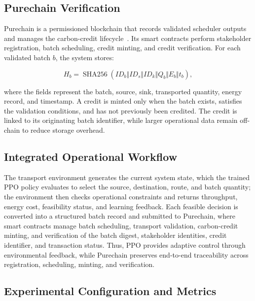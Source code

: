 \documentclass[conference]{IEEEtran}
\begin{document}
\subsection{Purechain Verification}

\vspace{-0.2cm}
Purechain is a permissioned blockchain that records validated scheduler outputs and manages the carbon-credit lifecycle~\cite{ajakwe2025ebctc}. Its smart contracts perform stakeholder registration, batch scheduling, credit minting, and credit verification. For each validated batch $b$, the system stores:

\vspace{-0.4cm}
\begin{equation}
H_b =
\operatorname{SHA256}
\left(
ID_b \Vert ID_s \Vert ID_k \Vert Q_b \Vert E_b \Vert t_b
\right),
\label{eq:hash}
\end{equation}

\vspace{-0.2cm}
where the fields represent the batch, source, sink, transported quantity, energy record, and timestamp. A credit is minted only when the batch exists, satisfies the validation conditions, and has not previously been credited. The credit is linked to its originating batch identifier, while larger operational data remain off-chain to reduce storage overhead.

\subsection{Integrated Operational Workflow}
\label{subsec:integrated_workflow}

The transport environment generates the current system state, which the trained PPO policy evaluates to select the source, destination, route, and batch quantity; the environment then checks operational constraints and returns throughput, energy cost, feasibility status, and learning feedback. Each feasible decision is converted into a structured batch record and submitted to Purechain, where smart contracts manage batch scheduling, transport validation, carbon-credit minting, and verification of the batch digest, stakeholder identities, credit identifier, and transaction status. Thus, PPO provides adaptive control through environmental feedback, while Purechain preserves end-to-end traceability across registration, scheduling, minting, and verification.


\subsection{Experimental Configuration and Metrics}
\label{subsec:experimental_setup}
\end{document}
